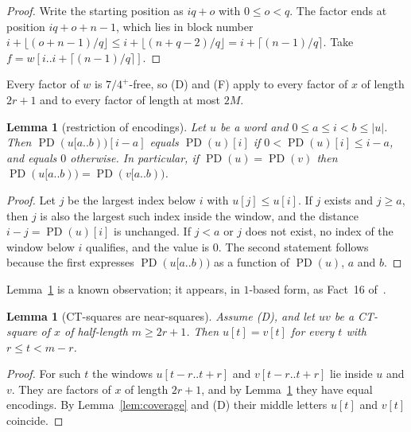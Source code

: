 \documentclass[11pt]{amsart}
\newtheorem{lemma}[theorem]{Lemma}
\theoremstyle{definition}
\theoremstyle{remark}
\newcommand{\PD}{\operatorname{PD}}
\begin{document}
\begin{proof}
Write the starting position as $iq+o$ with $0\le o<q$. The factor ends at position $iq+o+n-1$, which lies in block number $i+\lfloor(o+n-1)/q\rfloor\le i+\lfloor(n+q-2)/q\rfloor=i+\lceil(n-1)/q\rceil$. Take $f=w[i..i+\lceil(n-1)/q\rceil]$.
\end{proof}

Every factor of $w$ is $7/4^+$-free, so (D) and (F) apply to every factor of $x$ of length $2r+1$ and to every factor of length at most $2M$.

\begin{lemma}[restriction of encodings]\label{lem:window}
Let $u$ be a word and $0\le a\le i<b\le|u|$. Then $\PD(u[a..b))[i-a]$ equals $\PD(u)[i]$ if $0<\PD(u)[i]\le i-a$, and equals $0$ otherwise. In particular, if $\PD(u)=\PD(v)$ then $\PD(u[a..b))=\PD(v[a..b))$.
\end{lemma}

\begin{proof}
Let $j$ be the largest index below $i$ with $u[j]\le u[i]$. If $j$ exists and $j\ge a$, then $j$ is also the largest such index inside the window, and the distance $i-j=\PD(u)[i]$ is unchanged. If $j<a$ or $j$ does not exist, no index of the window below $i$ qualifies, and the value is $0$. The second statement follows because the first expresses $\PD(u[a..b))$ as a function of $\PD(u)$, $a$ and $b$.
\end{proof}

Lemma~\ref{lem:window} is a known observation; it appears, in $1$-based form, as Fact~16 of~\cite{CEM2026}.

\begin{lemma}[CT-squares are near-squares]\label{lem:near}
Assume (D), and let $uv$ be a CT-square of $x$ of half-length $m\ge2r+1$. Then $u[t]=v[t]$ for every $t$ with $r\le t<m-r$.
\end{lemma}

\begin{proof}
For such $t$ the windows $u[t-r..t+r]$ and $v[t-r..t+r]$ lie inside $u$ and $v$. They are factors of $x$ of length $2r+1$, and by Lemma~\ref{lem:window} they have equal encodings. By Lemma~\ref{lem:coverage} and (D) their middle letters $u[t]$ and $v[t]$ coincide.
\end{proof}
\end{document}
